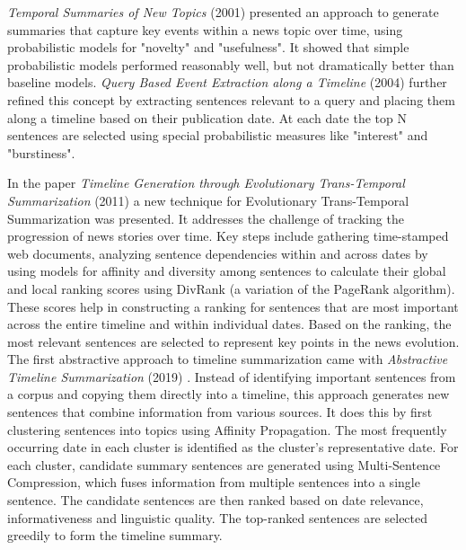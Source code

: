 \documentclass[12pt,oneside,bibtotoc,liststotoc]{scrbook}
\begin{document}
\textit{Temporal Summaries of New Topics} (2001) \cite{AllanTemporalSummaries} presented an approach to generate summaries that capture key events within a news topic over time, using probabilistic models for "novelty" and "usefulness". It showed that simple probabilistic models performed reasonably well, but not dramatically better than baseline models. \textit{Query Based Event Extraction along a Timeline} (2004) \cite{ChieuQueryBasedEvent} further refined this concept by extracting sentences relevant to a query and placing them along a timeline based on their publication date. At each date the top N sentences are selected using special probabilistic measures like "interest" and "burstiness".

In the paper \textit{Timeline Generation through Evolutionary Trans-Temporal Summarization} (2011) \cite{YanTimelineGeneration} a new technique for Evolutionary Trans-Temporal Summarization was presented. It addresses the challenge of tracking the progression of news stories over time. Key steps include gathering time-stamped web documents, analyzing sentence dependencies within and across dates by using models for affinity and diversity among sentences to calculate their global and local ranking scores using DivRank (a variation of the PageRank algorithm). These scores help in constructing a ranking for sentences that are most important across the entire timeline and within individual dates. Based on the ranking, the most relevant sentences are selected to represent key points in the news evolution. \\

The first abstractive approach to timeline summarization came with \textit{Abstractive Timeline Summarization} (2019) \cite{SteenAbstractiveTimeline}. Instead of identifying important sentences from a corpus and copying them directly into a timeline, this approach generates new sentences that combine information from various sources. It does this by first clustering sentences into topics using Affinity Propagation. The most frequently occurring date in each cluster is identified as the cluster's representative date. For each cluster, candidate summary sentences are generated using Multi-Sentence Compression, which fuses information from multiple sentences into a single sentence. The candidate sentences are then ranked based on date relevance, informativeness and linguistic quality. The top-ranked sentences are selected greedily to form the timeline summary. \\
\end{document}
